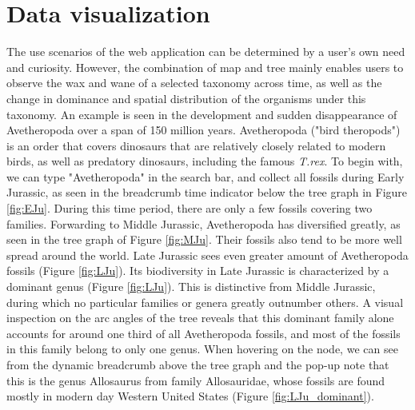 \documentclass[11pt, a4paper,oneside,chapterprefix=false]{scrbook}
\begin{document}
\newpage
\section{Data visualization} \label{sec:result_data_visualization}
The use scenarios of the web application can be determined by a user's own need and curiosity. However, the combination of map and tree mainly enables users to observe the wax and wane of a selected taxonomy across time, as well as the change in dominance and spatial distribution of the organisms under this taxonomy. An example is seen in the development and sudden disappearance of Avetheropoda over a span of 150 million years. Avetheropoda ("bird theropods") is an order that covers dinosaurs that are relatively closely related to modern birds, as well as predatory dinosaurs, including the famous \emph{T.rex}. To begin with, we can type "Avetheropoda" in the search bar, and collect all fossils during Early Jurassic, as seen in the breadcrumb time indicator below the tree graph in Figure \ref{fig:EJu}. During this time period, there are only a few fossils covering two families. Forwarding to Middle Jurassic, Avetheropoda has diversified greatly, as seen in the tree graph of Figure \ref{fig:MJu}. Their fossils also tend to be more well spread around the world. Late Jurassic sees even greater amount of Avetheropoda fossils (Figure \ref{fig:LJu}). Its biodiversity in Late Jurassic is characterized by a dominant genus (Figure \ref{fig:LJu}). This is distinctive from Middle Jurassic, during which no particular families or genera greatly outnumber others. A visual inspection on the arc angles of the tree reveals that this dominant family alone accounts for around one third of all Avetheropoda fossils, and most of the fossils in this family belong to only one genus. When hovering on the node, we can see from the dynamic breadcrumb above the tree graph and the pop-up note that this is the genus Allosaurus from family Allosauridae, whose fossils are found mostly in modern day Western United States (Figure \ref{fig:LJu_dominant}). \\
\end{document}
